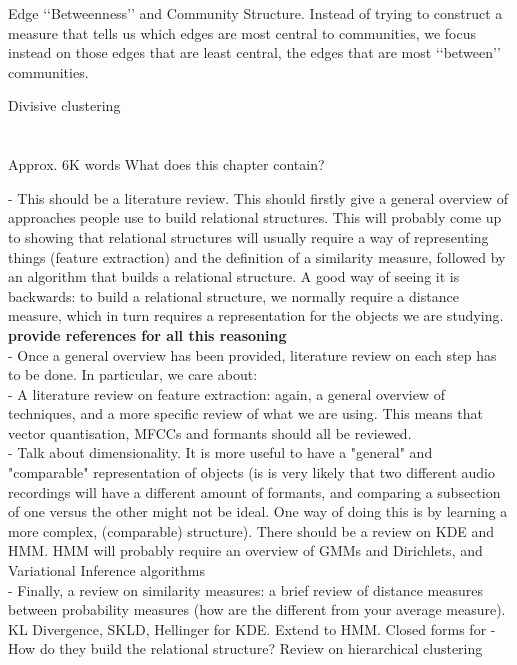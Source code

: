 \documentclass[../main.tex]{subfiles}
\begin{document}
Edge ‘‘Betweenness’’ and Community Structure.
Instead of trying to construct a measure that tells us which
edges are most central to communities, we focus instead on those
edges that are least central, the edges that are most ‘‘between’’
communities.

\cite{hastie2008}
Divisive clustering
\section{}





Approx. 6K words
What does this chapter contain?

- This should be a literature review. This should firstly give a general overview of approaches people use to build relational structures. This will probably come up to showing that relational structures will usually require a way of representing things (feature extraction) and the definition of a similarity measure, followed by an algorithm that builds a relational structure. A good way of seeing it is backwards: to build a relational structure, we normally require a distance measure, which in turn requires a representation for the objects we are studying. \textbf{provide references for all this reasoning}\\
- Once a general overview has been provided, literature review on each step has to be done. In particular, we care about:\\
- A literature review on feature extraction: again, a general overview of techniques, and a more specific review of what we are using. This means that vector quantisation, MFCCs and formants should all be reviewed.\\
- Talk about dimensionality. It is more useful to have a "general" and "comparable" representation of objects (is is very likely that two different audio recordings will have a different amount of formants, and comparing a subsection of one versus the other might not be ideal. One way of doing this is by learning a more complex, (comparable) structure). There should be a review on KDE and HMM. HMM will probably require an overview of GMMs and Dirichlets, and Variational Inference algorithms\\
- Finally, a review on similarity measures: a brief review of distance measures between probability measures (how are the different from your average measure). KL Divergence, SKLD, Hellinger for KDE. Extend to HMM. Closed forms for 
- How do they build the relational structure? Review on hierarchical clustering
\end{document}
